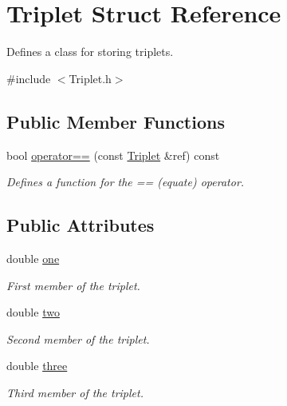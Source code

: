 \hypertarget{struct_triplet}{}\section{Triplet Struct Reference}
\label{struct_triplet}


Defines a class for storing triplets.  




{\ttfamily \#include $<$Triplet.\+h$>$}

\subsection*{Public Member Functions}
\begin{DoxyCompactItemize}
\item 
\mbox{\label{struct_triplet_a0b1a7ec0874020f2847c8407f9173f2b}} 
bool \mbox{\hyperlink{struct_triplet_a0b1a7ec0874020f2847c8407f9173f2b}{operator==}} (const \mbox{\hyperlink{struct_triplet}{Triplet}} \&ref) const
\begin{DoxyCompactList}\small\item\em Defines a function for the == (equate) operator. \end{DoxyCompactList}\end{DoxyCompactItemize}
\subsection*{Public Attributes}
\begin{DoxyCompactItemize}
\item 
\mbox{\label{struct_triplet_afaf969e44a0a2225ce73d537ffa6bc43}} 
double \mbox{\hyperlink{struct_triplet_afaf969e44a0a2225ce73d537ffa6bc43}{one}}
\begin{DoxyCompactList}\small\item\em First member of the triplet. \end{DoxyCompactList}\item 
\mbox{\label{struct_triplet_a0adbd3264e7f1d50d866cf030ea90a6c}} 
double \mbox{\hyperlink{struct_triplet_a0adbd3264e7f1d50d866cf030ea90a6c}{two}}
\begin{DoxyCompactList}\small\item\em Second member of the triplet. \end{DoxyCompactList}\item 
\mbox{\label{struct_triplet_a89db2ff7076dad94bebbaddc0b250fa8}} 
double \mbox{\hyperlink{struct_triplet_a89db2ff7076dad94bebbaddc0b250fa8}{three}}
\begin{DoxyCompactList}\small\item\em Third member of the triplet. \end{DoxyCompactList}\end{DoxyCompactItemize}


